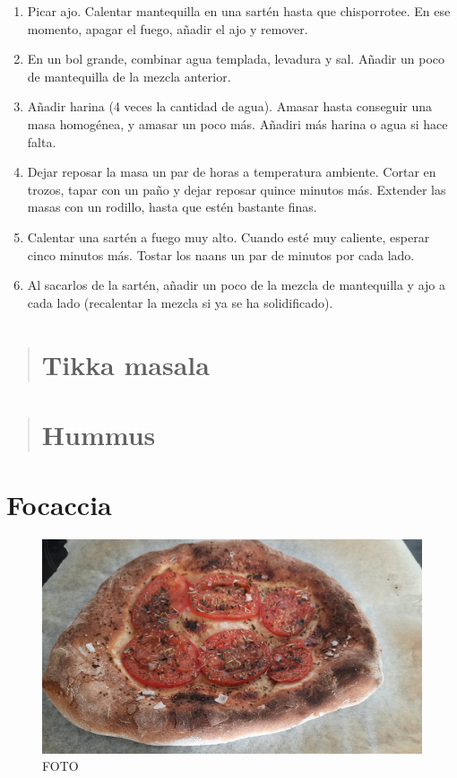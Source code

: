 \documentclass[
]{book}
\providecommand{\tightlist}{%
  \setlength{\itemsep}{0pt}\setlength{\parskip}{0pt}}
\begin{document}
\begin{enumerate}
\def\labelenumi{\arabic{enumi}.}
\tightlist
\item
  Picar ajo. Calentar mantequilla en una sartén hasta que chisporrotee. En ese momento, apagar el fuego, añadir el ajo y remover.
\item
  En un bol grande, combinar agua templada, levadura y sal. Añadir un poco de mantequilla de la mezcla anterior.
\item
  Añadir harina (4 veces la cantidad de agua). Amasar hasta conseguir una masa homogénea, y amasar un poco más. Añadiri más harina o agua si hace falta.
\item
  Dejar reposar la masa un par de horas a temperatura ambiente. Cortar en trozos, tapar con un paño y dejar reposar quince minutos más. Extender las masas con un rodillo, hasta que estén bastante finas.
\item
  Calentar una sartén a fuego muy alto. Cuando esté muy caliente, esperar cinco minutos más. Tostar los naans un par de minutos por cada lado.
\item
  Al sacarlos de la sartén, añadir un poco de la mezcla de mantequilla y ajo a cada lado (recalentar la mezcla si ya se ha solidificado).
\end{enumerate}

\begin{quote}
\hypertarget{tikka-masala}{%
\chapter{Tikka masala}\label{tikka-masala}}
\end{quote}

\begin{quote}
\hypertarget{hummus}{%
\chapter{Hummus}\label{hummus}}
\end{quote}

\hypertarget{focaccia}{%
\chapter{Focaccia}\label{focaccia}}

\begin{figure}
\centering
\includegraphics{images/focaccia.jpg}
\caption{FOTO}
\end{figure}
\end{document}
